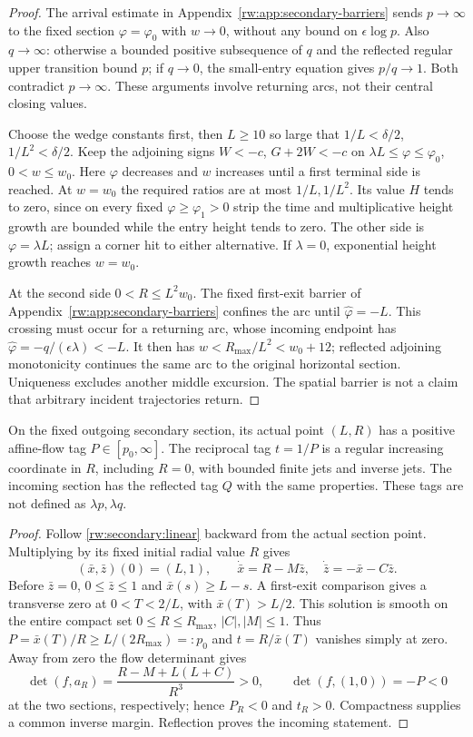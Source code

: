 \begin{proof}
The arrival estimate in Appendix~\ref{rw:app:secondary-barriers}
sends $p\to\infty$ to the fixed section $\varphi=\varphi_0$ with
$w\to0$, without any bound on $\epsilon\log p$.
Also $q\to\infty$: otherwise a bounded positive subsequence of $q$
and the reflected regular upper transition bound $p$; if $q\to0$,
the small-entry equation gives $p/q\to1$. Both contradict
$p\to\infty$. These arguments involve returning arcs, not their
central closing values.

Choose the wedge constants first, then $L\ge10$ so large that
$1/L<\delta/2$, $1/L^2<\delta/2$.
Keep the adjoining signs $W<-c$, $G+2W<-c$ on
$\lambda L\le\varphi\le\varphi_0$, $0<w\le w_0$.
Here $\varphi$ decreases and $w$ increases until a first terminal
side is reached. At $w=w_0$ the required ratios are at most
$1/L,1/L^2$. Its value $H$ tends to zero, since on every fixed
$\varphi\ge\varphi_1>0$ strip the time and multiplicative height
growth are bounded while the entry height tends to zero.
The other side is $\varphi=\lambda L$; assign a corner hit to
either alternative. If $\lambda=0$, exponential height growth
reaches $w=w_0$.

At the second side $0<R\le L^2w_0$.
The fixed first-exit barrier of
Appendix~\ref{rw:app:secondary-barriers} confines the arc until
$\hat\varphi=-L$. This crossing must occur for a returning arc,
whose incoming endpoint has
$\hat\varphi=-q/(\epsilon\lambda)<-L$.
It then has $w<R_{\max}/L^2<w_0+12$; reflected adjoining
monotonicity continues the same arc to the original horizontal
section. Uniqueness excludes another middle excursion.
The spatial barrier is not a claim that arbitrary incident
trajectories return.
\end{proof}

\begin{lemma}\label{rw:secondary:tags}
On the fixed outgoing secondary section, its actual point $(L,R)$
has a positive affine-flow tag $P\in[p_0,\infty]$.
The reciprocal tag $t=1/P$ is a regular increasing coordinate in $R$,
including $R=0$, with bounded finite jets and inverse jets.
The incoming section has the reflected tag $Q$ with the same
properties. These tags are not defined as $\lambda p,\lambda q$.
\end{lemma}

\begin{proof}
Follow \eqref{rw:secondary:linear} backward from the actual section
point. Multiplying by its fixed initial radial value $R$ gives
\[
 (\bar x,\bar z)(0)=(L,1),\qquad
 \dot{\bar x}=R-M\bar z,\quad \dot{\bar z}=-\bar x-C\bar z.
\]
Before $\bar z=0$, $0\le\bar z\le1$ and
$\bar x(s)\ge L-s$. A first-exit comparison gives a transverse
zero at $0<T<2/L$, with $\bar x(T)>L/2$.
This solution is smooth on the entire compact set
$0\le R\le R_{\max}$, $|C|,|M|\le1$.
Thus $P=\bar x(T)/R\ge L/(2R_{\max})=:p_0$ and
$t=R/\bar x(T)$ vanishes simply at zero.
Away from zero the flow determinant gives
\[
 \det(f,a_R)=\frac{R-M+L(L+C)}{R^3}>0,\qquad
 \det(f,(1,0))=-P<0
\]
at the two sections, respectively; hence $P_R<0$ and $t_R>0$.
Compactness supplies a common inverse margin. Reflection proves
the incoming statement.
\end{proof}

